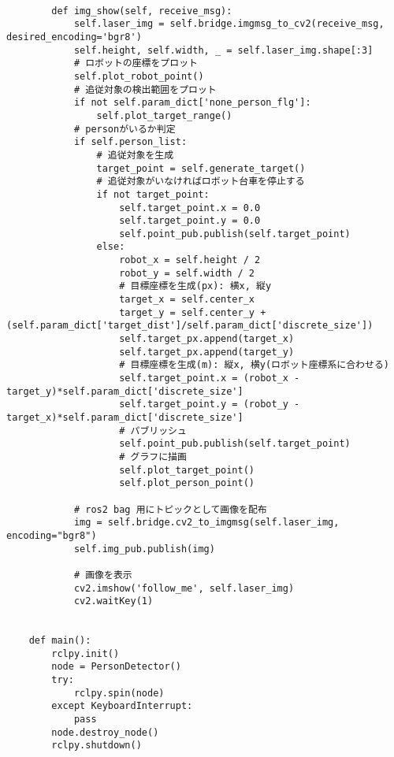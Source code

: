 \begin{lstlisting}[caption=person\_detector.py, label=person]
    
        def img_show(self, receive_msg):
            self.laser_img = self.bridge.imgmsg_to_cv2(receive_msg, desired_encoding='bgr8')
            self.height, self.width, _ = self.laser_img.shape[:3]
            # ロボットの座標をプロット
            self.plot_robot_point()
            # 追従対象の検出範囲をプロット
            if not self.param_dict['none_person_flg']:
                self.plot_target_range()
            # personがいるか判定
            if self.person_list:
                # 追従対象を生成
                target_point = self.generate_target()
                # 追従対象がいなければロボット台車を停止する
                if not target_point:
                    self.target_point.x = 0.0
                    self.target_point.y = 0.0
                    self.point_pub.publish(self.target_point)
                else:
                    robot_x = self.height / 2
                    robot_y = self.width / 2
                    # 目標座標を生成(px): 横x, 縦y
                    target_x = self.center_x
                    target_y = self.center_y + (self.param_dict['target_dist']/self.param_dict['discrete_size'])
                    self.target_px.append(target_x)
                    self.target_px.append(target_y)
                    # 目標座標を生成(m): 縦x, 横y(ロボット座標系に合わせる)
                    self.target_point.x = (robot_x - target_y)*self.param_dict['discrete_size']
                    self.target_point.y = (robot_y - target_x)*self.param_dict['discrete_size']
                    # パブリッシュ
                    self.point_pub.publish(self.target_point)
                    # グラフに描画
                    self.plot_target_point()
                    self.plot_person_point()
    
            # ros2 bag 用にトピックとして画像を配布
            img = self.bridge.cv2_to_imgmsg(self.laser_img, encoding="bgr8")
            self.img_pub.publish(img)
    
            # 画像を表示
            cv2.imshow('follow_me', self.laser_img)
            cv2.waitKey(1)
    
    
    def main():
        rclpy.init()
        node = PersonDetector()
        try:
            rclpy.spin(node)
        except KeyboardInterrupt:
            pass
        node.destroy_node()
        rclpy.shutdown()
\end{lstlisting}

